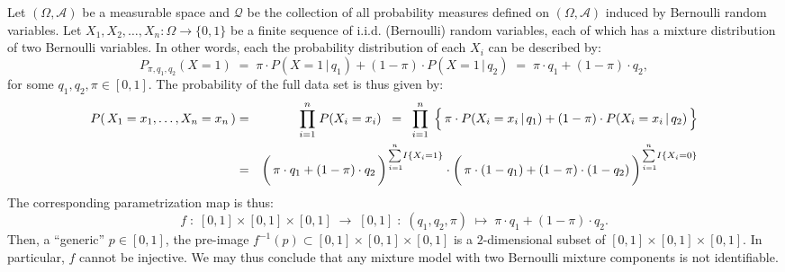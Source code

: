 \begin{example}
\mbox{}\vskip 0.05cm
\noindent
Let $\left(\Omega,\mathcal{A}\right)$ be a measurable space
and $\mathcal{Q}$ be the collection of all probability measures
defined on $\left(\Omega,\mathcal{A}\right)$ induced by Bernoulli random variables.
Let $X_{1}, X_{2}, \ldots, X_{n} : \Omega \longrightarrow \{0,1\}$
be a finite sequence of i.i.d. (Bernoulli) random variables,
each of which has a mixture distribution of two Bernoulli variables.
In other words, each the probability distribution of each $X_{i}$ can be described by:
\begin{equation*}
P_{\pi,q_{1},q_{2}}(X = 1)
\;=\; \pi \cdot P(X=1\,\vert\,q_{1}) + (1-\pi)\cdot P(X=1\,\vert\,q_{2})
\;=\; \pi \cdot q_{1} + (1-\pi)\cdot q_{2},
\end{equation*}
for some $q_{1}, q_{2},\pi \in [0,1]$.
The probability of the full data set is thus given by:
\begin{eqnarray*}
P\!\left(\,X_{1} = x_{1},\ldots,X_{n}=x_{n}\,\right)
& = & \overset{n}{\underset{i=1}{\prod}}\;P(X_{i}=x_{i})
\;\; = \;\; \overset{n}{\underset{i=1}{\prod}}\;
	\left\{\,
		\pi \cdot P(X_{i}=x_{i}\,\vert\,q_{1})
		\overset{{\color{white}.}}{+}
		(1-\pi)\cdot P(X_{i}=x_{i}\,\vert\,q_{2})
	\,\right\}
\\
&=&
	\left(\,
		\pi \cdot q_{1}
		\overset{{\color{white}|}}{+}
		(1-\pi)\cdot q_{2}
	\,\right)^{\overset{n}{\underset{\mbox{}\,i=1}{\sum}}I\{X_{i}=1\}}
	\cdot
	\left(\,
		\pi \cdot (1-q_{1})
		\overset{{\color{white}|}}{+}
		(1-\pi)\cdot (1-q_{2})
	\,\right)^{\overset{n}{\underset{\mbox{}\,i=1}{\sum}}I\{X_{i}=0\}}
\end{eqnarray*}
The corresponding parametrization map is thus:
\begin{equation*}
f \;:\; [0,1] \times [0,1] \times [0,1] \;\longrightarrow\; [0,1]
\;:\; (q_{1},q_{2},\pi) \;\longmapsto\; \pi \cdot q_{1} + (1-\pi)\cdot q_{2}.
\end{equation*}
Then, a ``generic'' $p \in [0,1]$, the pre-image
$f^{-1}(p) \subset [0,1] \times [0,1] \times [0,1]$
is a $2$-dimensional subset of $[0,1] \times [0,1] \times [0,1]$.
In particular, $f$ cannot be injective.
We may thus conclude that any mixture model with two
Bernoulli mixture components is not identifiable.
\end{example}

